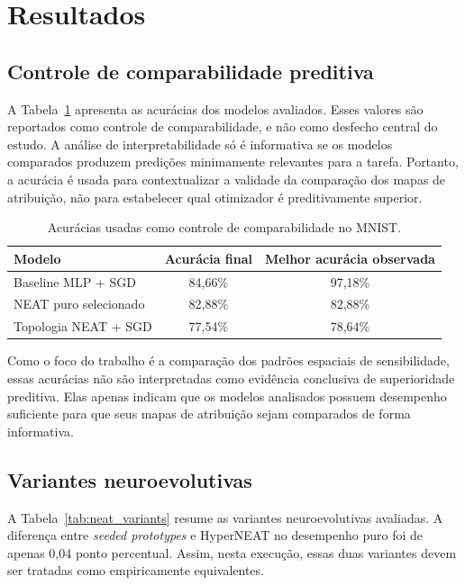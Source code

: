 \section{Resultados}

\subsection{Controle de comparabilidade preditiva}

A Tabela~\ref{tab:predictive_results} apresenta as acur\'acias dos modelos
avaliados. Esses valores s\~ao reportados como controle de comparabilidade, e n\~ao
como desfecho central do estudo. A an\'alise de interpretabilidade s\'o \'{e}
informativa se os modelos comparados produzem predi\c{c}\~oes minimamente
relevantes para a tarefa. Portanto, a acur\'acia \'{e} usada para contextualizar a
validade da compara\c{c}\~ao dos mapas de atribui\c{c}\~ao, n\~ao para estabelecer qual
otimizador \'{e} preditivamente superior.

\begin{table}[ht]
\centering
\caption{Acur\'acias usadas como controle de comparabilidade no MNIST.}
\label{tab:predictive_results}
\begin{tabular}{lcc}
\toprule
\textbf{Modelo} & \textbf{Acur\'acia final} & \textbf{Melhor acur\'acia observada} \\
\midrule
Baseline MLP + SGD & 84,66\% & 97,18\% \\
NEAT puro selecionado & 82,88\% & 82,88\% \\
Topologia NEAT + SGD & 77,54\% & 78,64\% \\
\bottomrule
\end{tabular}
\end{table}

Como o foco do trabalho \'{e} a compara\c{c}\~ao dos padr\~oes espaciais de
sensibilidade, essas acur\'acias n\~ao s\~ao interpretadas como evid\^encia
conclusiva de superioridade preditiva. Elas apenas indicam que os modelos
analisados possuem desempenho suficiente para que seus mapas de atribui\c{c}\~ao
sejam comparados de forma informativa.

\subsection{Variantes neuroevolutivas}

A Tabela~\ref{tab:neat_variants} resume as variantes neuroevolutivas avaliadas.
A diferen\c{c}a entre \textit{seeded prototypes} e HyperNEAT no desempenho puro foi
de apenas 0,04 ponto percentual. Assim, nesta execu\c{c}\~ao, essas duas variantes
devem ser tratadas como empiricamente equivalentes.

